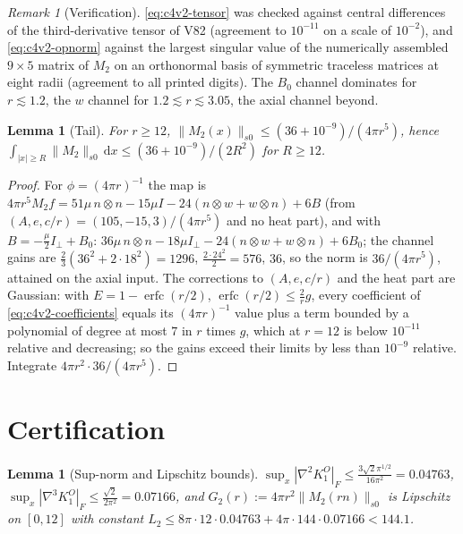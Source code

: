 \documentclass[11pt]{article}
\newcommand{\dd}{\,\mathrm d}
\theoremstyle{plain}
\newtheorem{lemma}[theorem]{Lemma}
\theoremstyle{definition}
\theoremstyle{remark}
\newtheorem{remark}[theorem]{Remark}
\begin{document}
\begin{remark}[Verification]
\label{rem:c4v2-verification}
\eqref{eq:c4v2-tensor} was checked against central differences of the
third-derivative tensor of V82 (agreement to \(10^{-11}\) on a scale of
\(10^{-2}\)), and \eqref{eq:c4v2-opnorm} against the largest singular value
of the numerically assembled \(9\times5\) matrix of \(M_2\) on an orthonormal
basis of symmetric traceless matrices at eight radii (agreement to
all printed digits).  The \(B_0\) channel dominates for \(r\lesssim1.2\), the \(w\)
channel for \(1.2\lesssim r\lesssim3.05\), the axial channel beyond.
\end{remark}

\begin{lemma}[Tail]
\label{lem:c4v2-tail}
For \(r\ge12\), \(\|M_2(x)\|_{s0}\le(36+10^{-9})/(4\pi r^5)\), hence
\(\int_{|x|\ge R}\|M_2\|_{s0}\dd x\le(36+10^{-9})/(2R^2)\) for \(R\ge12\).
\end{lemma}

\begin{proof}
For \(\phi=(4\pi r)^{-1}\) the map is
\(4\pi r^5M_2f=51\mu\,n\otimes n-15\mu I-24(n\otimes w+w\otimes n)+6B\) (from
\((A,e,c/r)=(105,-15,3)/(4\pi r^5)\) and no heat part), and with \(B=-\frac\mu2I_\perp+B_0\):
\(36\mu\,n\otimes n-18\mu I_\perp-24(n\otimes w+w\otimes n)+6B_0\); the channel gains are
\(\frac23(36^2+2\cdot18^2)=1296\), \(\frac{2\cdot24^2}2=576\), \(36\), so the norm is \(36/(4\pi r^5)\),
attained on the axial input.  The corrections to \((A,e,c/r)\) and the
heat part are Gaussian: with \(E=1-\operatorname{erfc}(r/2)\), \(\operatorname{erfc}(r/2)\le\frac2rg\), every
coefficient of \eqref{eq:c4v2-coefficients} equals its \((4\pi r)^{-1}\) value
plus a term bounded by a polynomial of degree at most \(7\) in \(r\)
times \(g\), which at \(r=12\) is below \(10^{-11}\) relative and decreasing;
so the gains exceed their limits by less than \(10^{-9}\) relative.
Integrate \(4\pi r^2\cdot36/(4\pi r^5)\).
\end{proof}

\section{Certification}
\label{sec:c4v2-certification}

\begin{lemma}[Sup-norm and Lipschitz bounds]
\label{lem:c4v2-lipschitz}
\(\sup_x|\nabla^2K^O_1|_F\le\frac{3\sqrt2\pi^{1/2}}{16\pi^2}=0.04763\), \(\sup_x|\nabla^3K^O_1|_F\le\frac{\sqrt2}{2\pi^2}=0.07166\), and
\(G_2(r):=4\pi r^2\|M_2(rn)\|_{s0}\) is Lipschitz on \([0,12]\) with constant
\(L_2\le8\pi\cdot12\cdot0.04763+4\pi\cdot144\cdot0.07166<144.1\).
\end{lemma}
\end{document}
